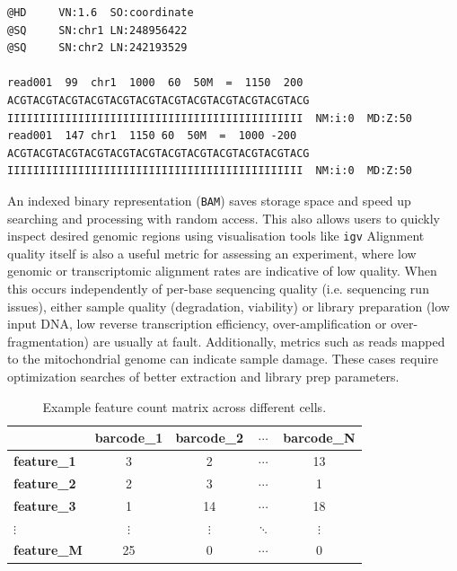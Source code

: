 \begin{center}
	\begin{minipage}{\linewidth}
		\begin{lstlisting}
@HD     VN:1.6  SO:coordinate
@SQ     SN:chr1 LN:248956422
@SQ     SN:chr2 LN:242193529

read001  99  chr1  1000  60  50M  =  1150  200  ACGTACGTACGTACGTACGTACGTACGTACGTACGTACGTACGTACG  IIIIIIIIIIIIIIIIIIIIIIIIIIIIIIIIIIIIIIIIIIIIII  NM:i:0  MD:Z:50
read001  147 chr1  1150 60  50M  =  1000 -200 ACGTACGTACGTACGTACGTACGTACGTACGTACGTACGTACGTACG  IIIIIIIIIIIIIIIIIIIIIIIIIIIIIIIIIIIIIIIIIIIIII  NM:i:0  MD:Z:50
\end{lstlisting}
		\label{fig:sam}
	\end{minipage}
\end{center}


An indexed binary representation (\verb|BAM|) saves storage space and speed up searching and processing with random access. This also allows users to quickly inspect desired genomic regions using visualisation tools like \verb|igv| Alignment quality itself is also a useful metric for assessing an experiment, where low genomic or transcriptomic alignment rates are indicative of low quality. When this occurs independently of per-base sequencing quality (i.e. sequencing run issues), either sample quality (degradation, viability) or library preparation (low input DNA, low reverse transcription efficiency, over-amplification or over-fragmentation) are usually at fault. Additionally, metrics such as reads mapped to the mitochondrial genome can indicate sample damage. These cases require optimization searches of better extraction and library prep parameters.

\begin{table}[ht]
	\centering
	\begin{tabular}{lcccc}
		\hline
		                    & \textbf{barcode\_1} & \textbf{barcode\_2} & $\cdots$ & \textbf{barcode\_N} \\ \hline
		\textbf{feature\_1} & 3                   & 2                   & $\cdots$ & 13                  \\
		\textbf{feature\_2} & 2                   & 3                   & $\cdots$ & 1                   \\
		\textbf{feature\_3} & 1                   & 14                  & $\cdots$ & 18                  \\
		$\vdots$            & $\vdots$            & $\vdots$            & $\ddots$ & $\vdots$            \\
		\textbf{feature\_M} & 25                  & 0                   & $\cdots$ & 0                   \\ \hline
	\end{tabular}
	\caption{Example feature count matrix across different cells.}
	\label{tab:feature_count_matrix}
\end{table}

